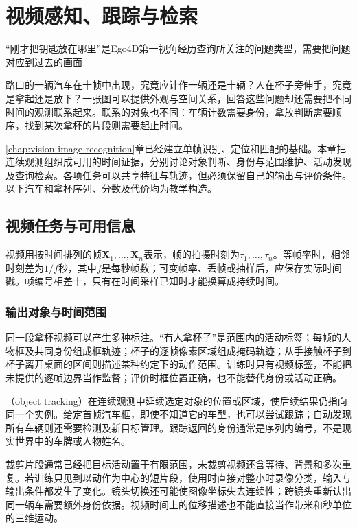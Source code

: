 \chapter{视频感知、跟踪与检索}
\label{chap:vision-video-recognition}

“刚才把钥匙放在哪里”是Ego4D第一视角经历查询所关注的问题类型，需要把问题对应到过去的画面

路口的一辆汽车在十帧中出现，究竟应计作一辆还是十辆？人在杯子旁伸手，究竟是拿起还是放下？一张图可以提供外观与空间关系，回答这些问题却还需要把不同时间的观测联系起来。联系的对象也不同：车辆计数需要身份，拿放判断需要顺序，找到某次拿杯的片段则需要起止时间。

\ref{chap:vision-image-recognition}章已经建立单帧识别、定位和匹配的基础。本章把连续观测组织成可用的时间证据，分别讨论对象判断、身份与范围维护、活动发现及查询检索。各项任务可以共享特征与轨迹，但必须保留自己的输出与评价条件。以下汽车和拿杯序列、分数及代价均为教学构造。

\section{视频任务与可用信息}
\label{sec:vision-video-information}

视频用按时间排列的帧$\bm{X}_1,\ldots,\bm{X}_n$表示，帧的拍摄时刻为$\tau_1,\ldots,\tau_n$。等帧率时，相邻时刻差为$1/f$秒，其中$f$是每秒帧数；可变帧率、丢帧或抽样后，应保存实际时间戳。帧编号相差十，只有在时间采样已知时才能换算成持续时间。

\subsection{输出对象与时间范围}
\label{sec:vision-video-outputs}

同一段拿杯视频可以产生多种标注。“有人拿杯子”是范围内的活动标签；每帧的人物框及共同身份组成框轨迹；杯子的逐帧像素区域组成掩码轨迹；从手接触杯子到杯子离开桌面的区间则描述某种约定下的动作范围。训练时只有视频标签，不能把未提供的逐帧边界当作监督；评价时框位置正确，也不能替代身份或活动正确。

（object tracking）在连续观测中延续选定对象的位置或区域，使后续结果仍指向同一个实例。给定首帧汽车框，即使不知道它的车型，也可以尝试跟踪；自动发现所有车辆则还需要检测及新目标管理。跟踪返回的身份通常是序列内编号，不是现实世界中的车牌或人物姓名。

裁剪片段通常已经把目标活动置于有限范围，未裁剪视频还含等待、背景和多次重复。若训练只见到以动作为中心的短片段，使用时直接对整小时录像分类，输入与输出条件都发生了变化。镜头切换还可能使图像坐标失去连续性；跨镜头重新认出同一辆车需要额外身份依据。视频时间上的位移描述也不能直接当作带米和秒单位的三维运动。

